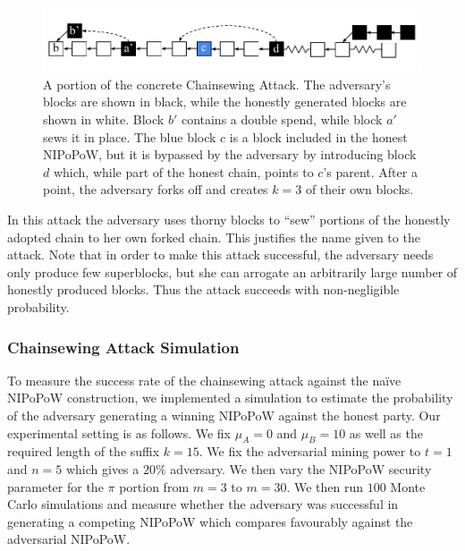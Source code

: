 \begin{figure}[h!]
	\begin{center}
		\includegraphics[width=0.9\columnwidth]{figures/chainsew-concrete.pdf}
	\end{center}
	\caption{A portion of the concrete Chainsewing Attack. The adversary's blocks are shown in black, while the honestly generated blocks are shown in white. Block $b'$ contains a double spend, while block $a'$ sews it in place. The blue block $c$ is a block included in the honest NIPoPoW, but it is bypassed by the adversary by introducing block $d$ which, while part of the honest chain, points to $c$'s parent. After a point, the adversary forks off and creates $k = 3$ of their own blocks.}
	\label{fig:attack}
\end{figure}

In this attack the adversary uses thorny blocks to ``sew'' portions of the
honestly adopted chain to her own forked chain. This justifies the name given to
the attack.
Note that in order to make this attack successful, the adversary needs only
produce few superblocks, but she can arrogate an arbitrarily large number of
honestly produced blocks. Thus the attack succeeds with non-negligible
probability.

\subsubsection{Chainsewing Attack Simulation}

To measure the success rate of the chainsewing attack against the na\"ive NIPoPoW construction, we implemented a simulation to estimate the probability of the adversary generating a winning NIPoPoW against the honest party. Our experimental setting is as follows. We fix $\mu_A = 0$ and $\mu_B = 10$ as well as the required length of the suffix $k = 15$. We fix the adversarial mining power to $t = 1$ and $n = 5$ which gives a $20\%$ adversary. We then vary the NIPoPoW security parameter for the $\pi$ portion from $m = 3$ to $m = 30$. We then run $100$ Monte Carlo simulations and measure whether the adversary was successful in generating a competing NIPoPoW which compares favourably against the adversarial NIPoPoW.

